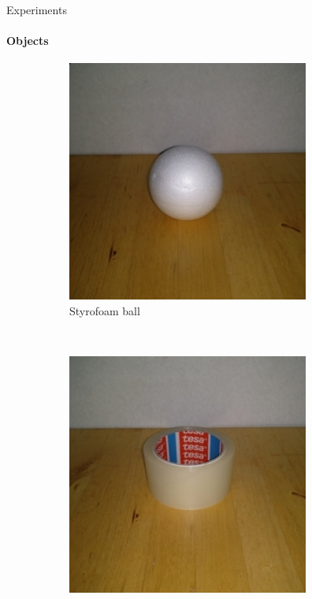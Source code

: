 \documentclass{beamer}
\begin{document}
\begin{frame}{Experiments}
\framesubtitle{Objects}%
\begin{figure}[t]
    \centering
    \begin{subfigure}[t]{0.23\textwidth}
        \includegraphics[width=\textwidth]{object_ball}
        \caption{\scriptsize Styrofoam ball}
        \label{fig:object_ball}
    \end{subfigure}
    ~
    \begin{subfigure}[t]{0.23\textwidth}
        \includegraphics[width=\textwidth]{object_duct_tape}

\end{subfigure}
\end{figure}
\end{frame}
\end{document}

